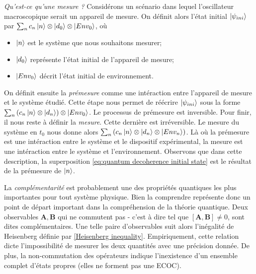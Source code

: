 \documentclass[11pt,oneside,a4paper]{article}
\begin{document}
\emph{Qu'est-ce qu'une mesure ?} Considérons un scénario dans lequel l'oscillateur macroscopique serait un appareil de mesure. On définit alors l'état initial $\ket{\psi_{ini}}$ par $\sum_n c_n\ket{n}\otimes\ket{d_0}\otimes\ket{Env_0}$, où 
\begin{itemize}
  \item[\ding{108}] $\ket{n}$ est le système que nous souhaitons mesurer;
  \item[\ding{108}] $\ket{d_0}$ représente l'état initial de l'appareil de mesure;
  \item[\ding{108}] $\ket{Env_0}$ décrit l'état initial de environnement.
\end{itemize}
On définit ensuite la \emph{prémesure} comme une intéraction entre l'appareil de mesure et le système étudié. Cette étape nous permet de réécrire $\ket{\psi_{ini}}$ sous la forme $\sum_n  \left(c_n\ket{n}\otimes\ket{d_n}\right)\otimes\ket{Env_0}$. Le processus de prémesure est inversible. Pour finir, il nous reste à définir la \emph{mesure}. Cette dernière est irréversible. Le mesure du système en $t_0$ nous donne alors $\sum_n \left(c_n\ket{n}\otimes\ket{d_n}\otimes\ket{Env_n}\right)$. Là où la prémesure est une intéraction entre le système et le dispositif expérimental, la mesure est une intéraction entre le système et l'environnement. Observons que dans cette description, la superposition \eqref{eq:quantum decoherence initial state} est le résultat de la prémesure de $\ket{n}$.

La \emph{complémentarité} est probablement une des propriétés quantiques les plus importantes pour tout système physique. Bien la comprendre représente donc un point de départ important dans la compréhension de la théorie quantique. Deux observables $\bm{A},\bm{B}$ qui ne commutent pas - c'est à dire tel que $\left[\bm{A},\bm{B}\right]\neq 0$, sont dites complémentaires. Une telle paire d'observables suit alors l'inégalité de Heisenberg définie par \eqref{Heisenberg inequality}. Empiriquement, cette relation dicte l'impossibilité de mesurer les deux quantités avec une précision donnée. De plus, la non-commutation des opérateurs indique l'inexistence d'un ensemble complet d'états propres (elles ne forment pas une ECOC).\\
\end{document}
